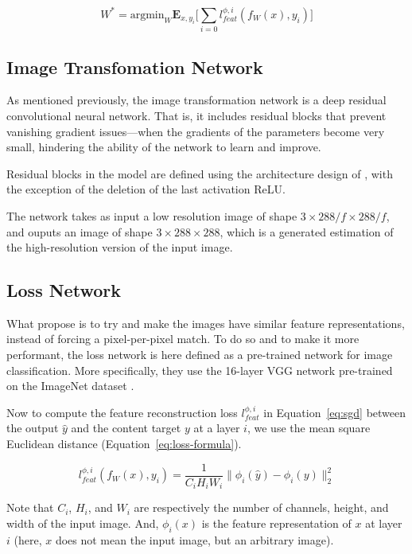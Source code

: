 \documentclass{article}
\begin{document}
{    \begin{equation}
        W^* = \text{argmin}_W \textbf{E}_{x,y_i} \biggl[ \sum_{i=0} l^{\phi, i}_{feat}(f_W(x), y_i) \biggr]
        \label{eq:sgd}
    \end{equation}

    {
        \subsection{Image Transfomation Network}
        \label{subsec:image-transformation-network-method}

        As mentioned previously, the image transformation network is a deep residual convolutional neural network. That is, it includes residual blocks that prevent vanishing gradient issues---when the gradients of the parameters become very small, hindering the ability of the network to learn and improve.

        Residual blocks in the model are defined using the architecture design of \cite{rb}, with the exception of the deletion of the last activation ReLU.

        \bigskip

        The network takes as input a low resolution image of shape $3 \times 288/f \times 288/f$, and ouputs an image of shape $3 \times 288 \times 288$, which is a generated estimation of the high-resolution version of the input image.
    }

    {
        \subsection{Loss Network}
        \label{subsec:loss-network-method}

        What propose \cite{sr} is to try and make the images have similar feature representations, instead of forcing a pixel-per-pixel match. To do so and to make it more performant, the loss network is here defined as a pre-trained network for image classification. More specifically, they use the 16-layer VGG network \citep{vgg} pre-trained on the ImageNet dataset \citep{image-net}.

        Now to compute the feature reconstruction loss $l^{\phi, i}_{feat}$ in Equation~\ref{eq:sgd} between the output $\hat y$ and the content target $y$ at a layer $i$, we use the mean square Euclidean distance (Equation~\ref{eq:loss-formula}).

        \begin{equation}
            l^{\phi, i}_{feat}(f_W(x), y_i) = \frac{1}{C_i H_i W_i} \lVert \phi_i (\hat y) - \phi_i (y) \rVert_2^2
            \label{eq:loss-formula}
        \end{equation}

        Note that $C_i$, $H_i$, and $W_i$ are respectively the number of channels, height, and width of the input image. And, $\phi_i (x)$ is the feature representation of $x$ at layer $i$ (here, $x$ does not mean the input image, but an arbitrary image).
    }
}
\end{document}
